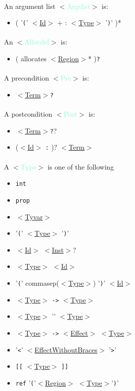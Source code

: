 \documentclass[a4paper]{scrreprt}
\newcommand{\cat}[1]{$<$\hyperref[#1]{#1}$>$}
\newcommand{\likecat}[1]{$<$\textcolor{Aquamarine}{#1}$>$}
\newcommand{\catdef}[1]{\label{#1}\likecat{#1}}
\begin{document}
\paragraph{}
An argument list \catdef{Argslist} is:
\begin{itemize}
  \item ( '{\tt (}' \cat{Id} + : \cat{Type} '{\tt )}' )*
\end{itemize}

\paragraph{}
An \catdef{Allocdef} is:
\begin{itemize}
  \item ( allocates \cat{Region}* ){\tt ?}
\end{itemize}

\paragraph{}
A precondition \catdef{Pre} is: 
\begin{itemize}
  \item \cat{Term}{\tt ?}
\end{itemize}

\paragraph{}
A postcondition \catdef{Post} is: 
\begin{itemize}
  \item \cat{Term}{\tt ?}? 
  \item (\cat{Id} {\tt :} )? \cat{Term}
\end{itemize}
  

\paragraph{}
A \catdef{Type} is one of the following
\begin{itemize}
  \item {\tt int}
  \item {\tt prop}
  \item \cat{Tyvar}
  \item '{\tt (}' \cat{Type} '{\tt )}'
  \item \cat{Id} \cat{Inst}?
  \item \cat{Type} \cat{Id}
  \item '{\tt (}' commasep(\cat{Type}) '{\tt )}' \cat{Id}
  \item \cat{Type} {\tt ->} \cat{Type}
  \item \cat{Type} '{\tt *}' \cat{Type}
  \item \cat{Type} {\tt ->} \cat{Effect} \cat{Type}
  \item '{\tt <}' \cat{EffectWithoutBraces} '{\tt >}'
  \item {\tt [[} \cat{Type} {\tt ]]}
  \item {\tt ref} '{\tt (}'\cat{Region} \cat{Type}'{\tt )}'
\end{itemize}
\end{document}
